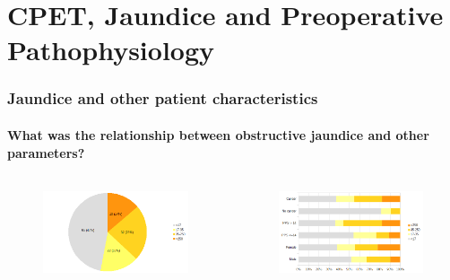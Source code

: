 \documentclass[10pt]{beamer}
\begin{document}
\section[Chapter 3]{CPET, Jaundice and Preoperative Pathophysiology}

\begin{frame}
	\frametitle{Jaundice and other patient characteristics}
	\framesubtitle{What was the relationship between obstructive jaundice and other parameters?}
	
	\begin{columns}
		
		\begin{figure}
			\includegraphics[width=\textwidth]{jaundice_distribution}
		\end{figure}
		
		\begin{figure}
			\includegraphics[width=\textwidth]{jaundice_vs_patient_factors}
		\end{figure}
		

\end{columns}
\end{frame}
\end{document}
